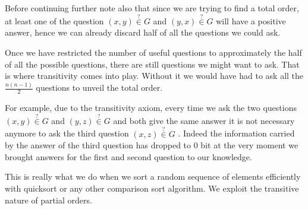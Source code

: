 Before continuing further note also that since we are trying to find a total order, at least one of the question $(x, y) \stackrel{?}{\in} G$ and $(y, x) \stackrel{?}{\in} G$ will have a positive answer, hence we can already discard half of all the questions we could ask.

Once we have restricted the number of useful questions to approximately the half of all the possible questions, there are still  questions we might want to ask. That is where transitivity comes into play. Without it we would have had to ask all the $\frac{n (n-1)}{2}$ questions to unveil the total order.

For example, due to the transitivity axiom, every time we ask the two questions $(x, y) \stackrel{?}{\in} G$ and $(y, z) \stackrel{?}{\in} G$ and both give the same answer it is not necessary anymore to ask the third question $(x, z) \stackrel{?}{\in} G$ . Indeed the information carried by the answer of the third question has dropped to 0 bit at the very moment we brought answers for the first and second question to our knowledge.

This is really what we do when we sort a random sequence of elements efficiently with quicksort or any other  comparison sort algorithm. We exploit the transitive nature of partial orders.